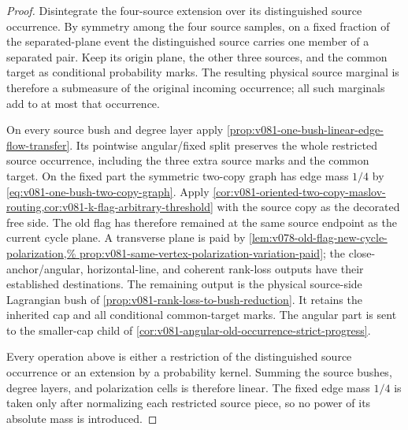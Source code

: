 \documentclass[10pt]{article}
\begin{document}
\begin{proof}
Disintegrate the four-source extension over its distinguished source occurrence.  By symmetry
among the four source samples, on a fixed fraction of the separated-plane event the distinguished
source carries one member of a separated pair.  Keep its origin plane, the other three sources, and
the common target as conditional probability marks.  The resulting physical source marginal is therefore a
submeasure of the original incoming occurrence; all such marginals add to at most that occurrence.

On every source bush and degree layer apply
\cref{prop:v081-one-bush-linear-edge-flow-transfer}.  Its pointwise angular/fixed split preserves
the whole restricted source occurrence, including the three extra source marks and the common
target.  On the fixed part the symmetric two-copy graph has edge mass \(1/4\) by
\eqref{eq:v081-one-bush-two-copy-graph}.  Apply
\cref{cor:v081-oriented-two-copy-maslov-routing,cor:v081-k-flag-arbitrary-threshold} with the source
copy as the decorated free side.  The old flag has therefore remained at the same source endpoint
as the current cycle plane.  A transverse plane is paid by
\cref{lem:v078-old-flag-new-cycle-polarization,%
prop:v081-same-vertex-polarization-variation-paid}; the close-anchor/angular, horizontal-line, and
coherent rank-loss outputs have their established destinations.  The remaining output is the
physical source-side Lagrangian bush of
\cref{prop:v081-rank-loss-to-bush-reduction}.  It retains the inherited cap and all conditional
common-target marks.  The angular part is sent to the smaller-cap child of
\cref{cor:v081-angular-old-occurrence-strict-progress}.

Every operation above is either a restriction of the distinguished source occurrence or an
extension by a probability kernel.  Summing the source bushes, degree layers, and polarization
cells is therefore linear.  The fixed edge mass \(1/4\) is taken only after normalizing each
restricted source piece, so no power of its absolute mass is introduced.
\end{proof}
\end{document}
